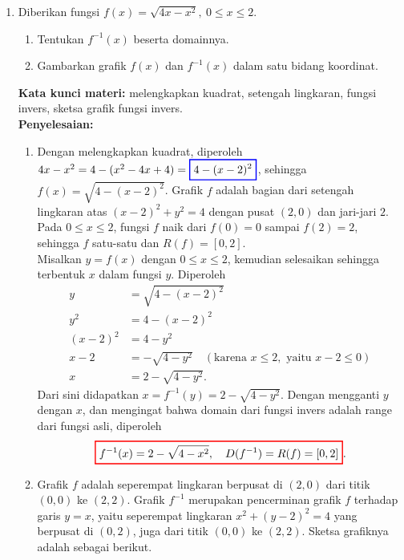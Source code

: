 \documentclass[10pt,openany,a4paper]{article}
\theoremstyle{definition}
\theoremstyle{definition}
\theoremstyle{plain}
\newenvironment{jawab}[2][tes]{%
\par\noindent\textbf{Kata kunci materi:} #1.\\
\textbf{Penyelesaian:} #2%
}{}
\begin{document}
\begin{enumerate}
    \item Diberikan fungsi $f(x)=\sqrt{4x-x^2},\ 0\leq x\leq 2$.
    \begin{enumerate}
        \item Tentukan $f^{-1}(x)$ beserta domainnya.
        \item Gambarkan grafik $f(x)$ dan $f^{-1}(x)$ dalam satu bidang koordinat.
    \end{enumerate}
    \begin{jawab}[melengkapkan kuadrat, setengah lingkaran, fungsi invers, sketsa grafik fungsi invers]{
        \begin{enumerate}
            \item Dengan melengkapkan kuadrat, diperoleh $4x-x^2 = 4-(x^2-4x+4) = \colorlet{oldcolor}{.}
        \color{blue}
        \setlength{\fboxrule}{1pt} \boxed{\color{oldcolor}4-(x-2)^2}\color{oldcolor}$, sehingga $f(x)=\sqrt{4-(x-2)^2}$. Grafik $f$ adalah bagian dari setengah lingkaran atas $(x-2)^2+y^2=4$ dengan pusat $(2,0)$ dan jari-jari $2$. Pada $0\leq x\leq 2$, fungsi $f$ naik dari $f(0)=0$ sampai $f(2)=2$, sehingga $f$ satu-satu dan $R(f)=[0,2]$.\\
            Misalkan $y=f(x)$ dengan $0\leq x\leq 2$, kemudian selesaikan sehingga terbentuk $x$ dalam fungsi $y$. Diperoleh
            \begin{align*}
                y &= \sqrt{4-(x-2)^2}\\
                y^2 &= 4-(x-2)^2\\
                (x-2)^2 &= 4-y^2\\
                x-2 &= -\sqrt{4-y^2} \quad (\text{karena } x\leq 2, \text{ yaitu } x-2\leq 0)\\
                x &= 2-\sqrt{4-y^2}.
            \end{align*}
            Dari sini didapatkan $x = f^{-1}(y) = 2-\sqrt{4-y^2}$. Dengan mengganti $y$ dengan $x$, dan mengingat bahwa domain dari fungsi invers adalah range dari fungsi asli, diperoleh
            \begin{align*}
                \colorlet{oldcolor}{.}
        \color{red}
        \setlength{\fboxrule}{1pt} \boxed{\color{oldcolor}f^{-1}(x) = 2-\sqrt{4-x^2},\quad D(f^{-1})=R(f)=[0,2]}\color{oldcolor}.
            \end{align*}
            \item Grafik $f$ adalah seperempat lingkaran berpusat di $(2,0)$ dari titik $(0,0)$ ke $(2,2)$. Grafik $f^{-1}$ merupakan pencerminan grafik $f$ terhadap garis $y=x$, yaitu seperempat lingkaran $x^2+(y-2)^2=4$ yang berpusat di $(0,2)$, juga dari titik $(0,0)$ ke $(2,2)$. Sketsa grafiknya adalah sebagai berikut.

\end{enumerate}}
\end{jawab}
\end{enumerate}
\end{document}
